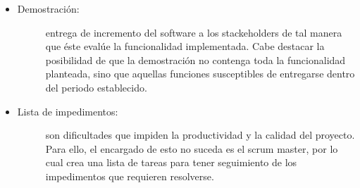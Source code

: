\begin{itemize}
    \item   \begin{description}
                \item[Demostración:] entrega de incremento del software a los stackeholders de tal manera que éste evalúe la funcionalidad implementada. Cabe destacar la posibilidad de que la demostración no contenga toda la funcionalidad planteada, sino que aquellas funciones susceptibles de entregarse dentro del periodo establecido.
            \end{description}
    
    \item   \begin{description}
                \item[Lista de impedimentos: ]  son dificultades que impiden la productividad y la calidad del proyecto. Para ello, el encargado de esto no suceda es el scrum master, por lo cual crea una lista de tareas para tener seguimiento de los impedimentos que requieren resolverse. 
        
            \end{description}
\end{itemize}